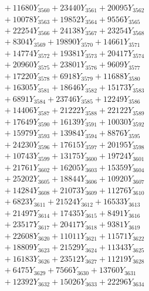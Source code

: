 \documentclass[a4paper,10pt]{article}
\begin{document}
{\begin{align}
&\;  + 11680 Y_{3560} + 23440 Y_{3561} + 20095 Y_{3562} \\[0.3ex]
&\;  + 10078 Y_{3563} + 19852 Y_{3564} + 9556 Y_{3565} \\[0.3ex]
&\;  + 22254 Y_{3566} + 24138 Y_{3567} + 23254 Y_{3568} \\[0.5ex]\allowbreak
&\;  + 8304 Y_{3569} + 19890 Y_{3570} + 14661 Y_{3571} \\[0.3ex]
&\;  + 14774 Y_{3572} + 19381 Y_{3573} + 20417 Y_{3574} \\[0.3ex]
&\;  + 20960 Y_{3575} + 23801 Y_{3576} + 9609 Y_{3577} \\[0.3ex]
&\;  + 17220 Y_{3578} + 6918 Y_{3579} + 11688 Y_{3580} \\[0.3ex]
&\;  + 16305 Y_{3581} + 18646 Y_{3582} + 15173 Y_{3583} \\[0.3ex]
&\;  + 6891 Y_{3584} + 23746 Y_{3585} + 12249 Y_{3586} \\[0.3ex]
&\;  + 14406 Y_{3587} + 21222 Y_{3588} + 22122 Y_{3589} \\[0.3ex]
&\;  + 17649 Y_{3590} + 16139 Y_{3591} + 10030 Y_{3592} \\[0.3ex]
&\;  + 15979 Y_{3593} + 13984 Y_{3594} + 8876 Y_{3595} \\[0.3ex]
&\;  + 24230 Y_{3596} + 17615 Y_{3597} + 20195 Y_{3598} \\[0.5ex]\allowbreak
&\;  + 10743 Y_{3599} + 13175 Y_{3600} + 19724 Y_{3601} \\[0.3ex]
&\;  + 21761 Y_{3602} + 16205 Y_{3603} + 15359 Y_{3604} \\[0.3ex]
&\;  + 25202 Y_{3605} + 18844 Y_{3606} + 10920 Y_{3607} \\[0.3ex]
&\;  + 14284 Y_{3608} + 21073 Y_{3609} + 11276 Y_{3610} \\[0.3ex]
&\;  + 6823 Y_{3611} + 21524 Y_{3612} + 16533 Y_{3613} \\[0.3ex]
&\;  + 21497 Y_{3614} + 17435 Y_{3615} + 8491 Y_{3616} \\[0.3ex]
&\;  + 23517 Y_{3617} + 20417 Y_{3618} + 9381 Y_{3619} \\[0.3ex]
&\;  + 22608 Y_{3620} + 11011 Y_{3621} + 11571 Y_{3622} \\[0.3ex]
&\;  + 18809 Y_{3623} + 21529 Y_{3624} + 11343 Y_{3625} \\[0.3ex]
&\;  + 16183 Y_{3626} + 23512 Y_{3627} + 11219 Y_{3628} \\[0.5ex]\allowbreak
&\;  + 6475 Y_{3629} + 7566 Y_{3630} + 13760 Y_{3631} \\[0.3ex]
&\;  + 12392 Y_{3632} + 15026 Y_{3633} + 22296 Y_{3634} \\[0.3ex]

\end{align}}
\end{document}
